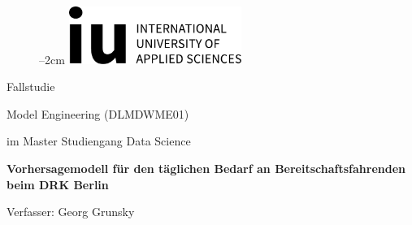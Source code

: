 
\label{titlePage}
\begin{figure}[h]
\centering
\advance\leftskip--2cm
\includegraphics[width=0.50\textwidth]{01_resources/logo.pdf}
\end{figure}
\FloatBarrier

\vspace*{5mm}

\begin{Large} 
\begin{center}
Fallstudie
\end{center}
\end{Large} 

\vspace*{5mm}

\begin{Large} 
\begin{center}
Model Engineering (DLMDWME01)
\end{center}
\end{Large} 

\begin{large} 
\begin{center}
im Master Studiengang Data Science
\end{center}
\end{large}

\vspace*{15mm}

\begin{Large} 
\begin{center}
\textbf{Vorhersagemodell für den täglichen Bedarf an Bereitschaftsfahrenden beim DRK Berlin}
\end{center}
\end{Large}



\vspace*{20mm}

\begin{large} 
\begin{center}
Verfasser: Georg Grunsky
\end{center}
\end{large} 

\vspace*{-6mm}

